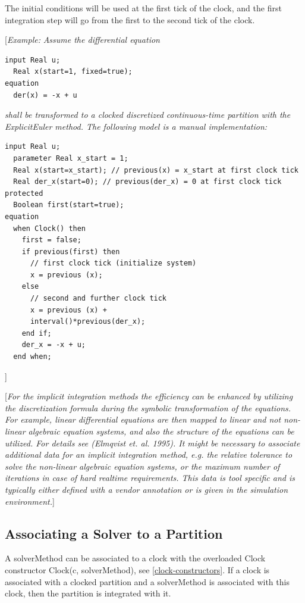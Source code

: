 \documentclass[10pt,a4paper]{report}
\def\doublelabel#1{\label{#1}}
\begin{document}
The initial conditions will be used at the first tick of the clock, and
the first integration step will go from the first to the second tick of
the clock.

{[}\emph{Example:}
\emph{Assume the differential equation}
\begin{lstlisting}[language=modelica]
  input Real u;
  Real x(start=1, fixed=true);
equation
  der(x) = -x + u
\end{lstlisting}
\emph{shall be transformed to a clocked discretized continuous-time
partition with the ExplicitEuler method. The following model is a manual
implementation:}

\begin{lstlisting}[language=modelica]
  input Real u;
  parameter Real x_start = 1;
  Real x(start=x_start); // previous(x) = x_start at first clock tick
  Real der_x(start=0); // previous(der_x) = 0 at first clock tick
protected 
  Boolean first(start=true);
equation 
  when Clock() then
    first = false;
    if previous(first) then
      // first clock tick (initialize system)
      x = previous (x);
    else
      // second and further clock tick
      x = previous (x) +
      interval()*previous(der_x);
    end if;
    der_x = -x + u;
  end when;
\end{lstlisting}
{]}

{[}\emph{For the implicit integration methods the efficiency can be
enhanced by utilizing the discretization formula during the symbolic
transformation of the equations. For example, linear differential
equations are then mapped to linear and not non-linear algebraic
equation systems, and also the structure of the equations can be
utilized. For details see (Elmqvist et. al. 1995). It might be necessary
to associate additional data for an implicit integration method, e.g.
the relative tolerance to solve the non-linear algebraic equation
systems, or the maximum number of iterations in case of hard realtime
requirements. This data is tool specific and is typically either defined
with a vendor annotation or is given in the simulation environment.}{]}

\subsection{Associating a Solver to a Partition}\doublelabel{associating-a-solver-to-a-partition}

A solverMethod can be associated to a clock with the overloaded Clock
constructor Clock(c, solverMethod), see \ref{clock-constructors}. If a clock is
associated with a clocked partition and a solverMethod is associated
with this clock, then the partition is integrated with it.
\end{document}
